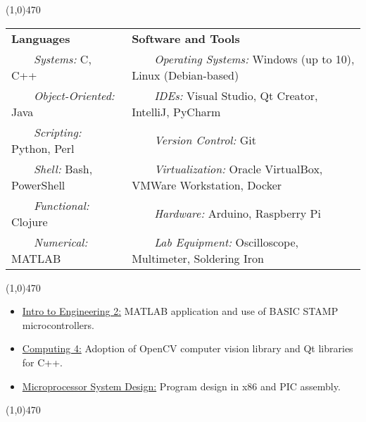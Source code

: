 \documentclass[11pt, a4paper]{article} %
\newcommand{\tabitem}{~~\llap{\textbullet}~~}
\begin{document}
\noindent \line(1,0){470}\\

 \smallskip
\vspace{-10pt}
\begin{center}
\begin{tabular}{l|l}
	{\bf Languages} & {\bf Software and Tools} \\
	\tabitem \textit{Systems:} C, C++ & \tabitem \textit{Operating Systems:} Windows (up to 10), Linux (Debian-based)\\
	\tabitem \textit{Object-Oriented:} Java & \tabitem \textit{IDEs:} Visual Studio, Qt Creator, IntelliJ, PyCharm\\
	\tabitem \textit{Scripting:} Python, Perl & \tabitem \textit{Version Control:} Git\\
	\tabitem \textit{Shell:} Bash, PowerShell & \tabitem \textit{Virtualization:} Oracle VirtualBox, VMWare Workstation, Docker \\
	\tabitem \textit{Functional:} Clojure & \tabitem \textit{Hardware:} Arduino, Raspberry Pi\\
	\tabitem \textit{Numerical:} MATLAB & \tabitem \textit{Lab Equipment:} Oscilloscope, Multimeter, Soldering Iron\\
\end{tabular}
\end{center}

\noindent \line(1,0){470}\\

\begin{itemize}
\itemsep0em
	\item \underline{Intro to Engineering 2:} MATLAB application and use of BASIC STAMP microcontrollers.
	\item \underline{Computing 4:} Adoption of OpenCV computer vision library and Qt libraries for C++.
	\item \underline{Microprocessor System Design:} Program design in x86 and PIC assembly.
\end{itemize}

\noindent \line(1,0){470} \\
\end{document}
